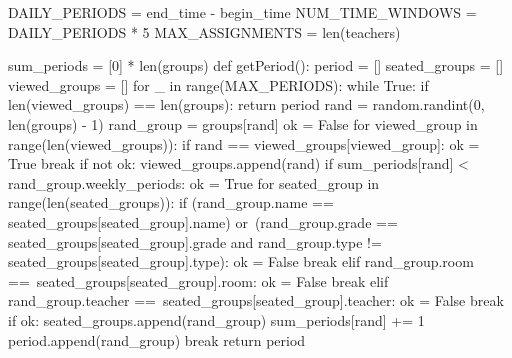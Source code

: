 \documentclass[12pt,a4paper]{report}
\begin{document}
\begin{python}
DAILY_PERIODS = end_time - begin_time
NUM_TIME_WINDOWS = DAILY_PERIODS * 5
MAX_ASSIGNMENTS = len(teachers)


sum_periods = [0] * len(groups)
def getPeriod():
    period = []
    seated_groups = []
    viewed_groups = []
    for _ in range(MAX_PERIODS):
        while True:
            if len(viewed_groups) == len(groups):
                return period
            rand = random.randint(0, len(groups) - 1)
            rand_group = groups[rand]
            ok = False
            for viewed_group in range(len(viewed_groups)):
                if rand == viewed_groups[viewed_group]:
                    ok = True
                    break
            if not ok:
                viewed_groups.append(rand)
                if sum_periods[rand] < rand_group.weekly_periods:
                    ok = True
                    for seated_group in range(len(seated_groups)):
                        if (rand_group.name ==
                           seated_groups[seated_group].name) or\
                           (rand_group.grade == 
                           seated_groups[seated_group].grade and
                           rand_group.type != 
                           seated_groups[seated_group].type):
                            ok = False
                            break
                        elif rand_group.room ==\
                           seated_groups[seated_group].room:
                            ok = False
                            break
                        elif rand_group.teacher ==\
                           seated_groups[seated_group].teacher:
                            ok = False
                            break
                    if ok:
                        seated_groups.append(rand_group)
                        sum_periods[rand] += 1
                        period.append(rand_group)
                        break
    return period
\end{python}
\end{document}
